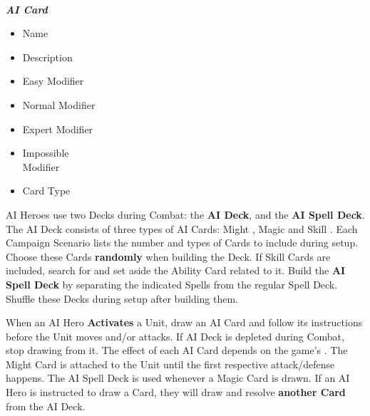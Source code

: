 \begin{multicols}{2}
\begin{multicols*}{2}
  \begin{center}
    \vspace*{-1.5em}
    \\
    \phantom{\ldots\ldots}\footnotesize{\textbf{\textit{\textcolor{darkcandyapplered}{AI Card}}}}
    \vspace*{-1em}
  \end{center}
  \vspace*{\fill}
  \columnbreak
  \scriptsize
  \begin{itemize}[itemsep=0pt]
    \item[\textbf{1.}] Name
    \item[\textbf{2.}] Description
    \item[\textbf{3.}] Easy Modifier
    \item[\textbf{4.}] Normal Modifier
    \item[\textbf{5.}] Expert Modifier
    \item[\textbf{6.}] Impossible\\Modifier
    \item[\textbf{7.}] Card Type
  \end{itemize}\vspace*{\fill}
\end{multicols*}

AI Heroes use two Decks during Combat: the \textbf{AI Deck}, and the \textbf{AI Spell Deck}.
The AI Deck consists of three types of AI Cards: Might , Magic  and Skill .
Each Campaign Scenario lists the number and types of Cards to include during setup.
Choose these Cards \textbf{randomly} when building the Deck.
If Skill Cards are included, search for and set aside the Ability Card related to it.
Build the \textbf{AI Spell Deck} by separating the indicated Spells from the regular Spell Deck.
Shuffle these Decks during setup after building them.

When an AI Hero \textbf{Activates} a Unit, draw an AI Card and follow its instructions before the Unit moves and/or attacks.
If AI Deck is depleted during Combat, stop drawing from it.
The effect of each AI Card depends on the game's .
The Might Card  is attached to the Unit until the first respective attack/defense happens.
The AI Spell Deck is used whenever a Magic Card  is drawn.
If an AI Hero is instructed to draw a Card, they will draw and resolve \textbf{another Card} from the AI Deck.


\end{multicols}
